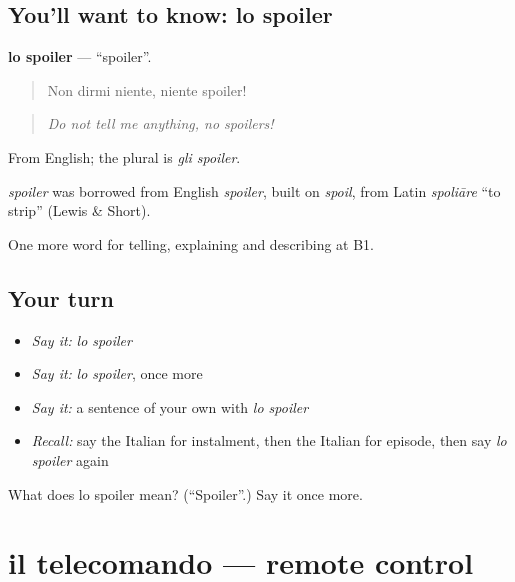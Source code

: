 \subsection*{You'll want to know: lo spoiler}
\textbf{lo spoiler} — \textquotedblleft{}spoiler\textquotedblright{}.

\begin{quote}
Non dirmi niente, niente spoiler!
\end{quote}

\begin{quote}
\emph{Do not tell me anything, no spoilers!}
\end{quote}

From English; the plural is \emph{gli spoiler}.

\begin{cousinweb}
\emph{spoiler} was borrowed from English \emph{spoiler}, built on \emph{spoil}, from Latin \emph{spoliāre} \textquotedblleft{}to strip\textquotedblright{} (Lewis \& Short).
\end{cousinweb}

\begin{grammarlens}[title={What you've built}]
One more word for telling, explaining and describing at B1.
\end{grammarlens}

\subsection*{Your turn}
\begin{itemize}
\raggedright
  \item \emph{Say it:} \emph{lo spoiler}
  \item \emph{Say it:} \emph{lo spoiler}, once more
  \item \emph{Say it:} a sentence of your own with \emph{lo spoiler}
  \item \emph{Recall:} say the Italian for instalment, then the Italian for episode, then say \emph{lo spoiler} again
\end{itemize}

\begin{tcolorbox}[breakable,colback=teal!4,colframe=teal!35!black,title={Before you move on}]
What does lo spoiler mean? (\textquotedblleft{}Spoiler\textquotedblright{}.) Say it once more.
\end{tcolorbox}
\section[il telecomando]{il telecomando — remote control}

